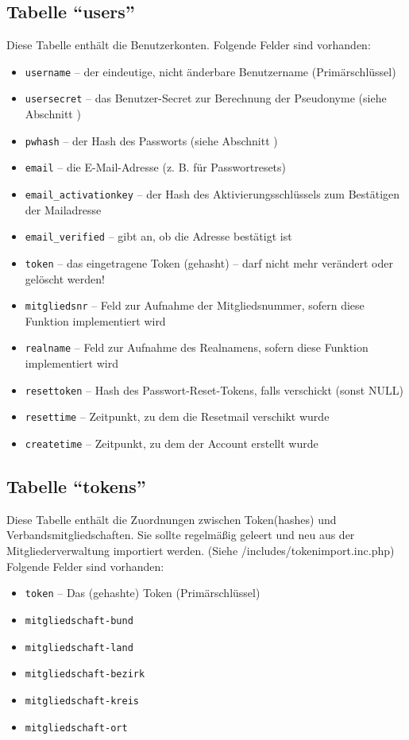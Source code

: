 \subsection{Tabelle "`users"'}
Diese Tabelle enthält die Benutzerkonten. Folgende Felder sind vorhanden:
\begin{itemize}
	\item \texttt{username} -- der eindeutige, nicht änderbare Benutzername (Primärschlüssel)
	\item \texttt{usersecret} -- das Benutzer-Secret zur Berechnung der Pseudonyme (siehe Abschnitt )
	\item \texttt{pwhash} -- der Hash des Passworts (siehe Abschnitt )
	\item \texttt{email} -- die E-Mail-Adresse (z. B. für Passwortresets)
	\item \texttt{email\_activationkey} -- der Hash des Aktivierungsschlüssels zum Bestätigen der Mailadresse
	\item \texttt{email\_verified} -- gibt an, ob die Adresse bestätigt ist
	\item \texttt{token} -- das eingetragene Token (gehasht) -- darf nicht mehr verändert oder gelöscht werden!
	\item \texttt{mitgliedsnr} -- Feld zur Aufnahme der Mitgliedsnummer, sofern diese Funktion implementiert wird
	\item \texttt{realname} -- Feld zur Aufnahme des Realnamens, sofern diese Funktion implementiert wird
	\item \texttt{resettoken} -- Hash des Passwort-Reset-Tokens, falls verschickt (sonst NULL)
	\item \texttt{resettime} -- Zeitpunkt, zu dem die Resetmail verschikt wurde
	\item \texttt{createtime} -- Zeitpunkt, zu dem der Account erstellt wurde
\end{itemize}


\subsection{Tabelle "`tokens"'}
Diese Tabelle enthält die Zuordnungen zwischen Token(hashes) und Verbandsmitgliedschaften.
Sie sollte regelmäßig geleert und neu aus der Mitgliederverwaltung importiert werden. (Siehe /includes/tokenimport.inc.php)
Folgende Felder sind vorhanden:
\begin{itemize}
	\item \texttt{token} -- Das (gehashte) Token (Primärschlüssel)
	\item \texttt{mitgliedschaft-bund}
	\item \texttt{mitgliedschaft-land}
	\item \texttt{mitgliedschaft-bezirk}
	\item \texttt{mitgliedschaft-kreis}
	\item \texttt{mitgliedschaft-ort}
\end{itemize}

